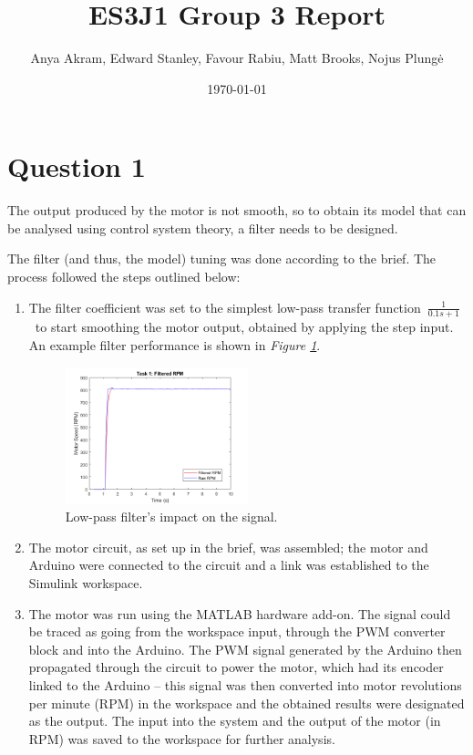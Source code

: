 \documentclass[11pt, onecolumn]{article}
\title{ES3J1 Group 3 Report}
\author{Anya Akram, Edward Stanley, Favour Rabiu, Matt Brooks, Nojus Plungė}
\date{\today}
\begin{document}
\maketitle

\section*{Question 1}
\par The output produced by the motor is not smooth, so to obtain its model that can be analysed using control system theory, a filter needs to be designed.
\\\par The filter (and thus, the model) tuning was done according to the brief. The process followed the steps outlined below:
\begin{enumerate}
    \item The filter coefficient was set to the simplest low-pass transfer function $\frac{1}{0.1s+1}$ to start smoothing the motor output, obtained by applying the step input. An example filter performance is shown in \textit{Figure \ref{fig:q1-filter}}.
          \begin{figure}[h!]
              \centering
              \includegraphics[width=0.5\textwidth]{q1-filter.png}
              \caption{Low-pass filter's impact on the signal.}
              \label{fig:q1-filter}
          \end{figure}
    \item The motor circuit, as set up in the brief, was assembled; the motor and Arduino were connected to the circuit and a link was established to the Simulink workspace.
    \item The motor was run using the MATLAB hardware add-on. The signal could be traced as going from the workspace input, through the PWM converter block and into the Arduino. The PWM signal generated by the Arduino then propagated through the circuit to power the motor, which had its encoder linked to the Arduino – this signal was then converted into motor revolutions per minute (RPM) in the workspace and the obtained results were designated as the output. The input into the system and the output of the motor (in RPM) was saved to the workspace for further analysis.

\end{enumerate}
\end{document}
